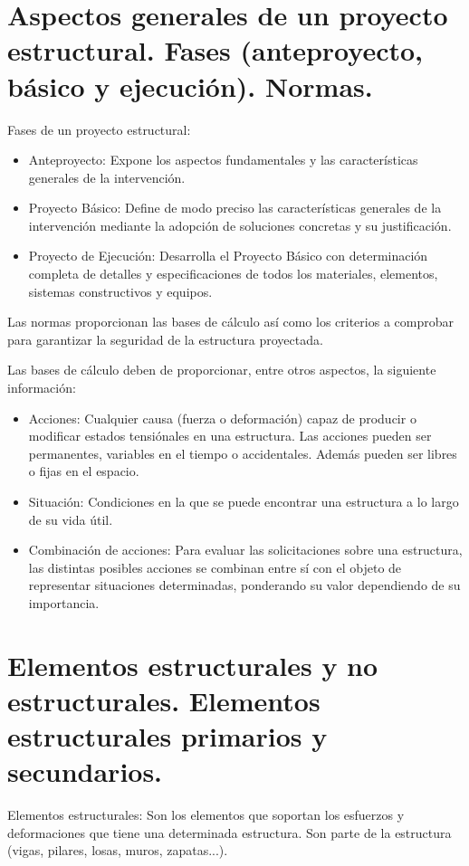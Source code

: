 \section{Aspectos generales de un proyecto estructural. Fases (anteproyecto, básico y ejecución). Normas.}
Fases de un proyecto estructural:
\begin{itemize}
    \item Anteproyecto: Expone los aspectos fundamentales y las características generales de la intervención.
    \item Proyecto Básico: Define de modo preciso las características generales de la intervención mediante la adopción de soluciones concretas y su justificación.
    \item Proyecto de Ejecución: Desarrolla el Proyecto Básico con determinación completa de detalles y especificaciones de todos los materiales, elementos, sistemas constructivos y equipos.
\end{itemize}

Las normas proporcionan las bases de cálculo así como los criterios a comprobar para garantizar la seguridad de la estructura proyectada.

Las bases de cálculo deben de proporcionar, entre otros aspectos, la siguiente información:
\begin{itemize}
    \item Acciones: Cualquier causa (fuerza o deformación) capaz de producir o modificar estados tensiónales en una estructura. Las acciones pueden ser permanentes, variables en el tiempo o accidentales. Además pueden ser libres o fijas en el espacio.
    \item Situación: Condiciones en la que se puede encontrar una estructura a lo largo de su vida útil.
    \item Combinación de acciones: Para evaluar las solicitaciones sobre una estructura, las distintas posibles acciones se combinan entre sí con el objeto de representar situaciones determinadas, ponderando su valor dependiendo de su importancia.
\end{itemize}

\section{Elementos estructurales y no estructurales. Elementos estructurales primarios y secundarios.}
Elementos estructurales: Son los elementos que soportan los esfuerzos y deformaciones que tiene una determinada estructura. Son parte de la estructura (vigas, pilares, losas, muros, zapatas...).

